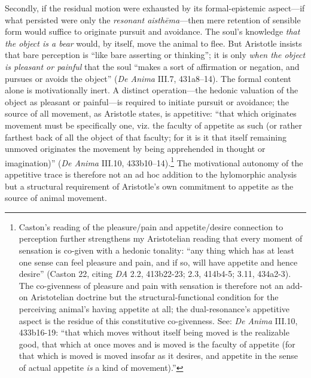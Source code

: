 \documentclass{article}
\begin{document}
Secondly, if the residual motion were exhausted by its formal-epistemic aspect---if what persisted were only the \textit{resonant aisthēma}---then mere retention of sensible form would suffice to originate pursuit and avoidance. The soul's knowledge \textit{that the object is a bear} would, by itself, move the animal to flee. But Aristotle insists that bare perception is ``like bare asserting or thinking''; it is only \textit{when the object is pleasant or painful} that the soul ``makes a sort of affirmation or negation, and pursues or avoids the object'' (\textit{De Anima} III.7, 431a8--14). The formal content alone is motivationally inert. A distinct operation---the hedonic valuation of the object as pleasant or painful---is required to initiate pursuit or avoidance; the source of all movement, as Aristotle states, is appetitive: ``that which originates movement must be specifically one, viz. the faculty of appetite as such (or rather farthest back of all the object of that faculty; for it is it that itself remaining unmoved originates the movement by being apprehended in thought or imagination)'' (\textit{De Anima} III.10, 433b10--14).\footnote{Caston's reading of the pleasure/pain and appetite/desire connection to perception further strengthens my Aristotelian reading that every moment of sensation is co-given with a hedonic tonality: ``any thing which has at least one sense can feel pleasure and pain, and if so, will have appetite and hence desire'' (Caston 22, citing \textit{DA} 2.2, 413b22-23; 2.3, 414b4-5; 3.11, 434a2-3). The co-givenness of pleasure and pain with sensation is therefore not an add-on Aristotelian doctrine but the structural-functional condition for the perceiving animal's having appetite at all; the dual-resonance's appetitive aspect is the residue of this constitutive co-givenness. See: \textit{De Anima} III.10, 433b16-19: ``that which moves without itself being moved is the realizable good, that which at once moves and is moved is the faculty of appetite (for that which is moved is moved insofar as it desires, and appetite in the sense of actual appetite \textit{is} a kind of movement).''} The motivational autonomy of the appetitive trace is therefore not an ad hoc addition to the hylomorphic analysis but a structural requirement of Aristotle's own commitment to appetite as the source of animal movement.
\end{document}
